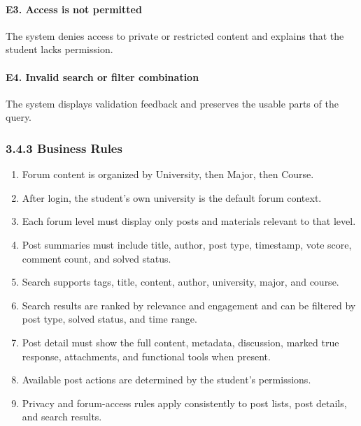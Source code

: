 \documentclass[12pt]{article}
\begin{document}
\paragraph*{E3. Access is not permitted}
\par\medskip
The system denies access to private or restricted content and explains that the student lacks permission.
\par\medskip
\hypertarget{sec:e4-invalid-search-or-filter-combination}{}
\paragraph*{E4. Invalid search or filter combination}
\par\medskip
The system displays validation feedback and preserves the usable parts of the query.
\par\medskip
\hypertarget{sec:3-4-3-business-rules}{}
\subsubsection*{3.4.3 Business Rules}
\par\medskip
\begin{enumerate}
\item Forum content is organized by University, then Major, then Course.
\item After login, the student's own university is the default forum context.
\item Each forum level must display only posts and materials relevant to that level.
\item Post summaries must include title, author, post type, timestamp, vote score, comment count, and solved status.
\item Search supports tags, title, content, author, university, major, and course.
\item Search results are ranked by relevance and engagement and can be filtered by post type, solved status, and time range.
\item Post detail must show the full content, metadata, discussion, marked true response, attachments, and functional tools when present.
\item Available post actions are determined by the student's permissions.
\item Privacy and forum-access rules apply consistently to post lists, post details, and search results.
\end{enumerate}
\par\medskip
\hypertarget{sec:3-5-special-requirements}{}
\end{document}
